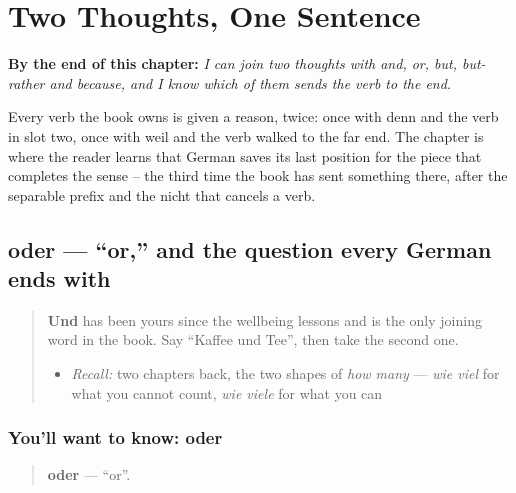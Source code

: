 
\chapter{Two Thoughts, One Sentence}
\label{ch:ge-verbindungen}

\begin{chapteropening}
\textbf{By the end of this chapter:} \emph{I can join two thoughts with and, or, but, but-rather and because, and I know which of them sends the verb to the end.}

Every verb the book owns is given a reason, twice: once with denn and the verb in slot two, once with weil and the verb walked to the far end. The chapter is where the reader learns that German saves its last position for the piece that completes the sense -- the third time the book has sent something there, after the separable prefix and the nicht that cancels a verb.
\end{chapteropening}

\section[oder]{oder — \textquotedblleft{}or,\textquotedblright{} and the question every German ends with}

\label{lesson:GE-C35-oder}



\begin{quote}
\textbf{Und} has been yours since the wellbeing lessons and is the only joining word in the book. Say \textquotedblleft{}Kaffee und Tee\textquotedblright{}, then take the second one.

\begin{itemize}
\raggedright
  \item \emph{Recall:} two chapters back, the two shapes of \emph{how many} — \emph{wie viel} for what you cannot count, \emph{wie viele} for what you can
\end{itemize}
\end{quote}

\subsection*{You'll want to know: oder}
\begin{quote}
\textbf{oder} — \textquotedblleft{}or\textquotedblright{}.
\end{quote}

